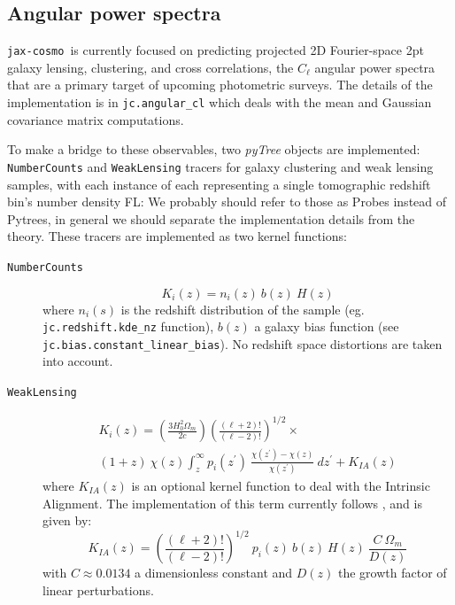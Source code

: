 \documentclass[twocolumn,twocolappendix,nofootinbib,iop]{openjournal}
\newcommand{\FrL}[1]{{\color{cyan}FL: #1}}
\newcommand{\jaxcosmo}{\texttt{jax-cosmo}}
\begin{document}
\subsection{Angular power spectra}
%
\jaxcosmo\ is currently focused on predicting projected 2D Fourier-space 2pt galaxy lensing, clustering, and cross correlations, the $C_\ell$ angular power spectra that are a primary target of upcoming photometric surveys. The details of the implementation is in \texttt{jc.angular\_cl} which deals with the mean and Gaussian covariance matrix computations.

To make a bridge to these observables, two \textit{pyTree} objects are implemented: \texttt{NumberCounts} and \texttt{WeakLensing} tracers for galaxy clustering and weak lensing samples, with each instance of each representing a single tomographic redshift bin's number density \FrL{We probably should refer to those as Probes instead of Pytrees, in general we should separate the implementation details from the theory}. These tracers are implemented as two kernel functions:

\begin{description}
\item[\texttt{NumberCounts}]
    \begin{equation}
        K_i(z) = n_i(z)\ b(z)\ H(z)
    \end{equation}
where $n_i(s)$ is the redshift distribution of the sample (eg. \texttt{jc.redshift.kde\_nz} function), $b(z)$ a galaxy bias function (see  \texttt{jc.bias.constant\_linear\_bias}). No redshift space distortions are taken into account.

\item [\texttt{WeakLensing}]
    \begin{multline}
 K_i(z) = \left( \frac{3 H_0^2\Omega_m}{2 c} \right) \left(\frac{(\ell+2)!}{(\ell-2)!} \right)^{1/2}\times 
 \\  (1+z)\ \chi(z) \int_z^\infty p_i(z^\prime)\ \frac{\chi(z^\prime)-\chi(z)}{\chi(z^\prime)}\ dz^\prime + K_{IA}(z)
    \end{multline}
where $K_{IA}(z)$ is an optional kernel function to deal with the Intrinsic Alignment. The implementation of this term currently follows \citet{2011A&A...527A..26J}, and is given by:
\begin{equation}
    K_{IA}(z) =   \left(\frac{(\ell+2)!}{(\ell-2)!}\right)^{1/2}\ p_i(z)\ b(z)\  H(z)\ \frac{C\  \Omega_m}{D(z)}
\end{equation}
with $C\approx 0.0134$ a dimensionless constant and $D(z)$ the growth factor of linear perturbations.
\end{description}
\end{document}
